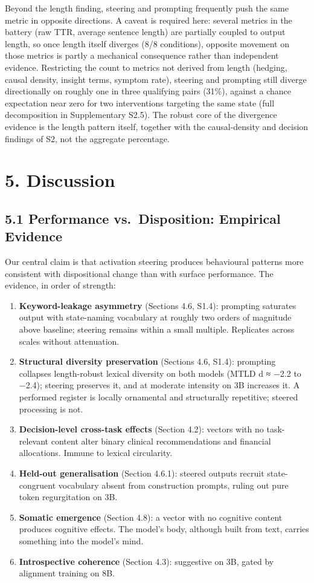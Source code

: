 \documentclass[11pt,a4paper]{article}
\providecommand{\tightlist}{\setlength{\itemsep}{0pt}\setlength{\parskip}{0pt}}
\begin{document}
Beyond the length finding, steering and prompting frequently push the same metric in opposite directions. A caveat is required here: several metrics in the battery (raw TTR, average sentence length) are partially coupled to output length, so once length itself diverges (8/8 conditions), opposite movement on those metrics is partly a mechanical consequence rather than independent evidence. Restricting the count to metrics not derived from length (hedging, causal density, insight terms, symptom rate), steering and prompting still diverge directionally on roughly one in three qualifying pairs (31\%), against a chance expectation near zero for two interventions targeting the same state (full decomposition in Supplementary S2.5). The robust core of the divergence evidence is the length pattern itself, together with the causal-density and decision findings of S2, not the aggregate percentage.

\section*{5. Discussion}

\subsection*{5.1 Performance vs.~Disposition: Empirical Evidence}

Our central claim is that activation steering produces behavioural patterns more consistent with dispositional change than with surface performance. The evidence, in order of strength:

\begin{enumerate}
\def\labelenumi{\arabic{enumi}.}
\tightlist
\item
  \textbf{Keyword-leakage asymmetry} (Sections 4.6, S1.4): prompting saturates output with state-naming vocabulary at roughly two orders of magnitude above baseline; steering remains within a small multiple. Replicates across scales without attenuation.
\item
  \textbf{Structural diversity preservation} (Sections 4.6, S1.4): prompting collapses length-robust lexical diversity on both models (MTLD d ≈ −2.2 to −2.4); steering preserves it, and at moderate intensity on 3B increases it. A performed register is locally ornamental and structurally repetitive; steered processing is not.
\item
  \textbf{Decision-level cross-task effects} (Section 4.2): vectors with no task-relevant content alter binary clinical recommendations and financial allocations. Immune to lexical circularity.
\item
  \textbf{Held-out generalisation} (Section 4.6.1): steered outputs recruit state-congruent vocabulary absent from construction prompts, ruling out pure token regurgitation on 3B.
\item
  \textbf{Somatic emergence} (Section 4.8): a vector with no cognitive content produces cognitive effects. The model's body, although built from text, carries something into the model's mind.
\item
  \textbf{Introspective coherence} (Section 4.3): suggestive on 3B, gated by alignment training on 8B.
\end{enumerate}
\end{document}
